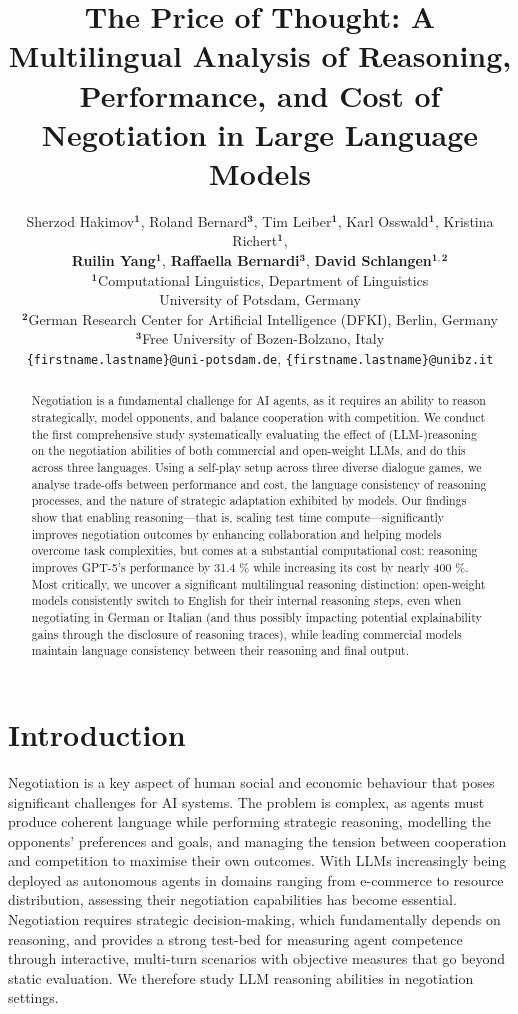 \documentclass[11pt]{article}
\title{The Price of Thought: A Multilingual Analysis of Reasoning, Performance, and Cost of Negotiation in Large Language Models}
\author{%
Sherzod Hakimov${^\mathbf{1}}$, 
Roland Bernard${^\mathbf{3}}$, 
Tim Leiber${^\mathbf{1}}$,
Karl Osswald${^\mathbf{1}}$,
Kristina Richert${^\mathbf{1}}$,\\
\textbf{Ruilin Yang}${^\mathbf{1}}$,
\textbf{Raffaella Bernardi}${^\mathbf{3}}$,
\textbf{David Schlangen}${^\mathbf{1,2}}$\\$^{\mathbf{1}}$Computational Linguistics, Department of Linguistics\\
University of Potsdam, Germany\\
$^{\mathbf{2}}$German Research Center for Artificial Intelligence (DFKI), Berlin, Germany\\
$^{\mathbf{3}}$Free University of Bozen-Bolzano, Italy\\
{\texttt{\{firstname.lastname\}@uni-potsdam.de}}, 
{\texttt{\{firstname.lastname\}@unibz.it}}
}
\begin{document}
\maketitle
\begin{abstract}
Negotiation is a fundamental challenge for AI agents, as it requires an ability to reason strategically, model opponents, and balance cooperation with competition. We conduct the first comprehensive study systematically evaluating the effect of (LLM-)reasoning on the negotiation abilities of both commercial and open-weight LLMs, and do this across three languages. Using a self-play setup across three diverse dialogue games, we analyse trade-offs between performance and cost, the language consistency of reasoning processes, and the nature of strategic adaptation exhibited by models.
Our findings show that enabling reasoning---that is, scaling test time compute---significantly improves negotiation outcomes by enhancing collaboration and helping models overcome task complexities, but comes at a substantial computational cost: reasoning improves GPT-5's performance by 31.4 \% while increasing its cost by nearly 400 \%. Most critically, we uncover a significant multilingual reasoning distinction: open-weight models consistently switch to English for their internal reasoning steps, even when negotiating in German or Italian (and thus possibly impacting potential explainability gains through the disclosure of reasoning traces), while leading commercial models maintain language consistency between their reasoning and final output.
\end{abstract}

\section{Introduction}

Negotiation is a key aspect of human social and economic behaviour that poses significant challenges for AI systems. The problem is complex, as agents must produce coherent language while performing strategic reasoning, modelling the opponents' preferences and goals, and managing the tension between cooperation and competition to maximise their own outcomes. 
With LLMs increasingly being deployed as autonomous agents in domains ranging from e-commerce to resource distribution, assessing their negotiation capabilities has become essential. Negotiation requires strategic decision-making, which fundamentally depends on reasoning, and provides a strong test-bed for measuring agent competence through interactive, multi-turn scenarios with objective measures that go beyond static evaluation. We therefore study LLM reasoning abilities in negotiation settings.
\end{document}
